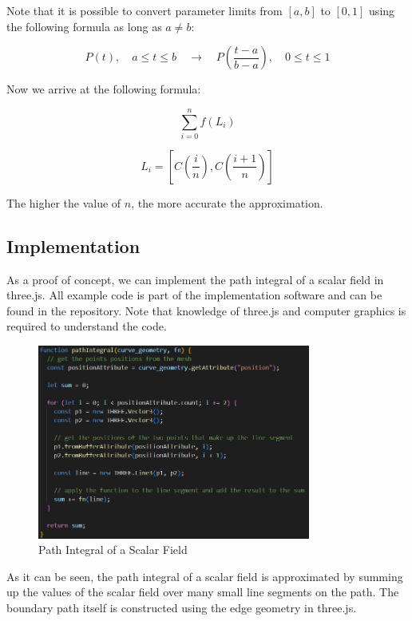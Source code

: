 \documentclass[12pt]{article}
\begin{document}
Note that it is possible to convert parameter limits from \([a, b]\) to \([0, 1]\) using the following formula as long as \(a \neq b\):

\[
    P(t), \quad a \leq t \leq b \quad \rightarrow \quad P\left(\frac{t - a}{b - a}\right), \quad 0 \leq t \leq 1
\]

Now we arrive at the following formula:

\[
    \sum_{i=0}^{n} f\left(L_i\right)
\]

\[
    L_i = \left[C\left(\frac{i}{n}\right), C\left(\frac{i + 1}{n}\right)\right]
\]

The higher the value of \(n\), the more accurate the approximation.

\subsection{Implementation}

As a proof of concept, we can implement the path integral of a scalar field in three.js\cite{El-Deeb_PEU-218_Stokes_Threejs}. All example code is
part of the implementation software and can be found in the repository\cite{El-Deeb_PEU-218_Assignments}. Note that knowledge of three.js and computer graphics is required to understand the code.

\begin{figure}[H]
    \centering
    \includegraphics[width=0.8\textwidth]{images/path_int.png}
    \caption{Path Integral of a Scalar Field\cite{El-Deeb_PEU-218_Stokes_Threejs}}
\end{figure}

As it can be seen, the path integral of a scalar field is approximated by summing up the values of the scalar field over many small line segments on the path.
The boundary path itself is constructed using the edge geometry in three.js.
\end{document}
